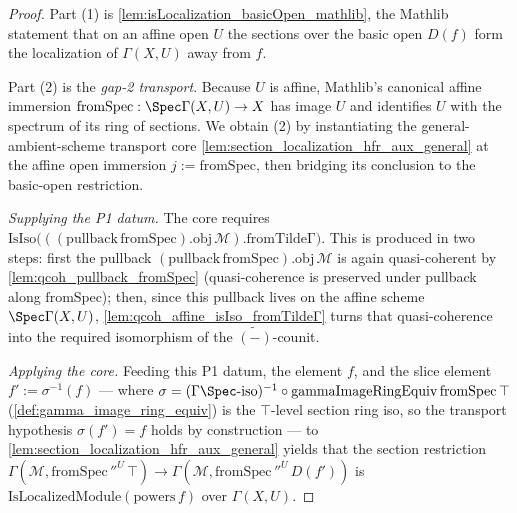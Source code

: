 \begin{proof}
  Part (1) is \cref{lem:isLocalization_basicOpen_mathlib}, the Mathlib statement
  that on an affine open \(U\) the sections over the basic open \(D(f)\) form the
  localization of \(\Gamma(X,U)\) away from \(f\).

  Part (2) is the \emph{gap-2 transport}. Because \(U\) is affine, Mathlib's
  canonical affine immersion \(\mathrm{fromSpec} : \Spec \Gamma(X, U) \to X\) has
  image \(U\) and identifies \(U\) with the spectrum of its ring of sections. We
  obtain (2) by instantiating the general-ambient-scheme transport core
  \cref{lem:section_localization_hfr_aux_general} at the affine open immersion
  \(j := \mathrm{fromSpec}\), then bridging its conclusion to the basic-open
  restriction.

  \emph{Supplying the P1 datum.} The core requires
  \(\mathrm{IsIso}\bigl(((\mathrm{pullback}\,\mathrm{fromSpec}).\mathrm{obj}\,
  \mathcal{M}).\mathrm{fromTildeΓ}\bigr)\). This is produced in two steps: first the
  pullback \((\mathrm{pullback}\,\mathrm{fromSpec}).\mathrm{obj}\,\mathcal{M}\) is
  again quasi-coherent by \cref{lem:qcoh_pullback_fromSpec} (quasi-coherence is
  preserved under pullback along \(\mathrm{fromSpec}\)); then, since this pullback
  lives on the affine scheme \(\Spec \Gamma(X, U)\),
  \cref{lem:qcoh_affine_isIso_fromTildeΓ} turns that quasi-coherence into the
  required isomorphism of the \(\widetilde{(-)}\)-counit.

  \emph{Applying the core.} Feeding this P1 datum, the element \(f\), and the slice
  element \(f' := \sigma^{-1}(f)\) --- where
  \(\sigma = (\Gamma\Spec\text{-iso})^{-1} \circ
  \mathrm{gammaImageRingEquiv}\,\mathrm{fromSpec}\,\top\)
  (\cref{def:gamma_image_ring_equiv}) is the \(\top\)-level section ring iso, so the
  transport hypothesis \(\sigma(f') = f\) holds by construction --- to
  \cref{lem:section_localization_hfr_aux_general} yields that the section
  restriction
  \(\Gamma(\mathcal{M}, \mathrm{fromSpec}\,''^{U}\,\top) \to
  \Gamma(\mathcal{M}, \mathrm{fromSpec}\,''^{U}\,D(f'))\) is
  \(\mathrm{IsLocalizedModule}(\mathrm{powers}\,f)\) over \(\Gamma(X, U)\).


\end{proof}
